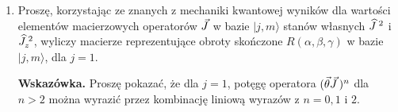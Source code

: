 \documentclass[a4paper,11pt]{article}
\begin{document}
\begin{enumerate}
\item Proszę, korzystając ze znanych z mechaniki kwantowej wyników dla
  wartości elementów macierzowych operatorów $\vec{J}$ w bazie $| j, m \rangle$
  stanów własnych $\widehat{J}^{ \; 2 }$ i $\widehat{J}_{ z }^{ \; 2 }$, wyliczy
  macierze reprezentujące obroty skończone $R( \alpha, \beta, \gamma )$ w bazie
  $| j, m \rangle$, dla $j = 1$.

  \textbf{Wskazówka.} Proszę pokazać, że dla $j = 1$, potęgę operatora
  $( \vec{ \theta } \vec{J} \, )^{ n }$ dla $n > 2$ można wyrazić przez kombinację
  liniową wyrazów z $n = 0, 1$ i $2$.




\end{enumerate}































\end{document}
